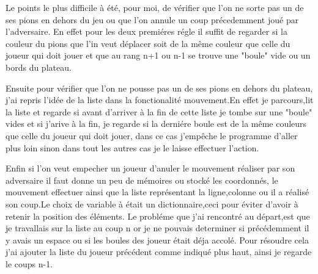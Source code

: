\documentclass{article}
\begin{document}
Le points le plus difficile à été, pour moi, de vérifier que l'on ne sorte pas un de ses pions en dehors du jeu ou que l'on annule un coup précedemment joué par l'adversaire.
En effet pour les deux premiéres régle il suffit de regarder si la couleur du pions que l'in veut déplacer soit de la même couleur que celle du joueur qui doit jouer et que au rang n+1 ou n-1 se trouve une "boule" vide ou un bords du plateau.

\vspace{0.5cm}

Ensuite pour vérifier que l'on ne pousse pas un de ses pions en dehors du plateau, j'ai repris l'idée de la liste dans la fonctionalité mouvement.En effet je parcours,lit la liste et regarde si avant d'arriver à la fin de cette liste je tombe sur une "boule" vides et si j'arive à la fin, je regarde si la derniére boule est de la même couleurs que celle du joueur qui doit jouer, dans ce cas j'empêche le programme d'aller plus loin sinon dans tout les autres cas je le laisse effectuer l'action.

\vspace{0.5cm}

Enfin si l'on veut empecher un joueur d'anuler le mouvement réaliser par son adversaire il faut donne un peu de mémoires ou stocké les coordonnés, le mouvement effectuer ainsi que la liste représentant la ligne,colonne ou il a réalisé son coup.Le choix de variable à était un dictionnaire,ceci pour éviter d'avoir à retenir la position des éléments. Le probléme que j'ai rencontré au départ,est que je travallais sur la liste au coup n or je ne pouvais determiner si précédemment il y avais un espace ou si les boules des joueur était déja accolé. Pour résoudre cela j'ai ajouter la liste du joueur précédent comme indiqué plus haut, ainsi je regarde le coups n-1.
\end{document}
